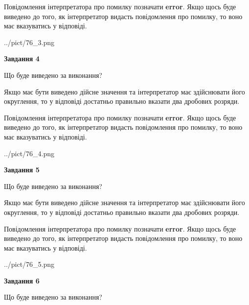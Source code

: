 \documentclass[12pt, ukrainian]{article}
\begin{document}
{\begin {Large}
Повідомлення інтерпретатора про помилку позначати \textbf{error}.
Якщо щось буде виведено до того, як інтерпретатор видасть повідомлення про помилку, 
то воно має вказуватись у відповіді. \par

\begin{center}
	{../pict/76_3.png}
\end{center}
\newpage

{\begin {center}\textbf{Завдання 4}\end {center}}\par
Що буде виведено за виконання? \par

Якщо має бути виведено дійсне значення та інтерпретатор має здійснювати його округлення, 
то у відповіді достатньо правильно вказати два дробових розряди.

Повідомлення інтерпретатора про помилку позначати \textbf{error}.
Якщо щось буде виведено до того, як інтерпретатор видасть повідомлення про помилку, 
то воно має вказуватись у відповіді. \par

\begin{center}
	{../pict/76_4.png}
\end{center}
\newpage

{\begin {center}\textbf{Завдання 5}\end {center}}\par
Що буде виведено за виконання? \par

Якщо має бути виведено дійсне значення та інтерпретатор має здійснювати його округлення, 
то у відповіді достатньо правильно вказати два дробових розряди.

Повідомлення інтерпретатора про помилку позначати \textbf{error}.
Якщо щось буде виведено до того, як інтерпретатор видасть повідомлення про помилку, 
то воно має вказуватись у відповіді. \par

\begin{center}
	{../pict/76_5.png}
\end{center}
\newpage

{\begin {center}\textbf{Завдання 6}\end {center}}\par
Що буде виведено за виконання? \par


\end{Large}}
\end{document}
